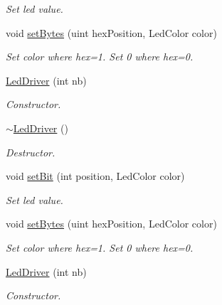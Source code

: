 \begin{DoxyCompactItemize}
\begin{DoxyCompactList}\small\item\em Set led value. \end{DoxyCompactList}\item 
void \hyperlink{classLedDriver_a765b8b642e13715ccaff1cbcff01dc97}{set\+Bytes} (uint hex\+Position, Led\+Color color)
\begin{DoxyCompactList}\small\item\em Set color where hex=1. Set 0 where hex=0. \end{DoxyCompactList}\item 
\mbox{\label{classLedDriver_a23265705c54ed45e32b91ed9b2f4e0b6}} 
\hyperlink{classLedDriver_a23265705c54ed45e32b91ed9b2f4e0b6}{Led\+Driver} (int nb)
\begin{DoxyCompactList}\small\item\em Constructor. \end{DoxyCompactList}\item 
\mbox{\label{classLedDriver_a8b6afd79e2715068ff08c51a9df28065}} 
\hyperlink{classLedDriver_a8b6afd79e2715068ff08c51a9df28065}{$\sim$\+Led\+Driver} ()
\begin{DoxyCompactList}\small\item\em Destructor. \end{DoxyCompactList}\item 
void \hyperlink{classLedDriver_a1856fb030d88bcacdc37dfce7f0f8136}{set\+Bit} (int position, Led\+Color color)
\begin{DoxyCompactList}\small\item\em Set led value. \end{DoxyCompactList}\item 
void \hyperlink{classLedDriver_a765b8b642e13715ccaff1cbcff01dc97}{set\+Bytes} (uint hex\+Position, Led\+Color color)
\begin{DoxyCompactList}\small\item\em Set color where hex=1. Set 0 where hex=0. \end{DoxyCompactList}\item 
\mbox{\label{classLedDriver_a23265705c54ed45e32b91ed9b2f4e0b6}} 
\hyperlink{classLedDriver_a23265705c54ed45e32b91ed9b2f4e0b6}{Led\+Driver} (int nb)
\begin{DoxyCompactList}\small\item\em Constructor. \end{DoxyCompactList}\item 

\end{DoxyCompactItemize}

